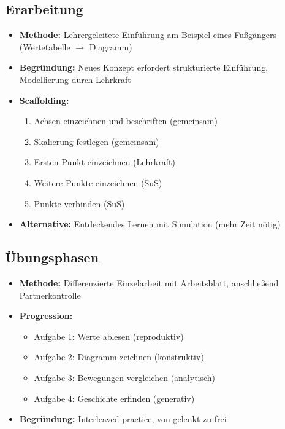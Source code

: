 \documentclass[11pt,a4paper]{article}
\begin{document}
\subsection{Erarbeitung}
\begin{itemize}
    \item \textbf{Methode:} Lehrergeleitete Einführung am Beispiel eines Fußgängers (Wertetabelle $\to$ Diagramm)
    \item \textbf{Begründung:} Neues Konzept erfordert strukturierte Einführung, Modellierung durch Lehrkraft
    \item \textbf{Scaffolding:}
    \begin{enumerate}
        \item Achsen einzeichnen und beschriften (gemeinsam)
        \item Skalierung festlegen (gemeinsam)
        \item Ersten Punkt einzeichnen (Lehrkraft)
        \item Weitere Punkte einzeichnen (SuS)
        \item Punkte verbinden (SuS)
    \end{enumerate}
    \item \textbf{Alternative:} Entdeckendes Lernen mit Simulation (mehr Zeit nötig)
\end{itemize}

\subsection{Übungsphasen}
\begin{itemize}
    \item \textbf{Methode:} Differenzierte Einzelarbeit mit Arbeitsblatt, anschließend Partnerkontrolle
    \item \textbf{Progression:}
    \begin{itemize}
        \item Aufgabe 1: Werte ablesen (reproduktiv)
        \item Aufgabe 2: Diagramm zeichnen (konstruktiv)
        \item Aufgabe 3: Bewegungen vergleichen (analytisch)
        \item Aufgabe 4: Geschichte erfinden (generativ)
    \end{itemize}
    \item \textbf{Begründung:} Interleaved practice, von gelenkt zu frei
\end{itemize}
\end{document}
